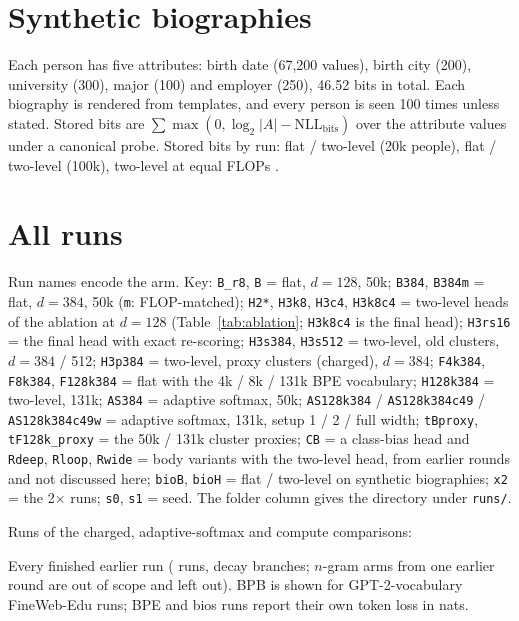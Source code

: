 \documentclass[11pt]{article}
\theoremstyle{remark}
\begin{document}
\section{Synthetic biographies}
Each person has five attributes: birth date (67,200 values), birth city (200), university (300), major (100) and employer (250),
46.52 bits in total. Each biography is rendered from templates, and every person is seen 100 times unless stated. Stored bits are
$\sum \max(0, \log_2|A| - \mathrm{NLL}_{\text{bits}})$ over the attribute values under a canonical probe. Stored bits by run:
flat \BitsBTwenty{} / two-level \BitsHTwenty{} (20k people), flat \BitsBHundred{} / two-level \BitsHHundred{} (100k), two-level at
equal FLOPs \BitsHEqF{}.

\section{All runs}\label{app:runs}
Run names encode the arm. Key: \texttt{B\_r8}, \texttt{B} = flat, $d=128$, 50k; \texttt{B384}, \texttt{B384m} = flat, $d=384$,
50k (\texttt{m}: FLOP-matched); \texttt{H2*}, \texttt{H3k8}, \texttt{H3c4}, \texttt{H3k8c4} = two-level heads of the ablation at
$d=128$ (Table~\ref{tab:ablation}; \texttt{H3k8c4} is the final head); \texttt{H3rs16} = the final head with exact re-scoring;
\texttt{H3s384}, \texttt{H3s512} = two-level, old clusters, $d=384$ / 512; \texttt{H3p384} = two-level, proxy clusters (charged),
$d=384$; \texttt{F4k384}, \texttt{F8k384}, \texttt{F128k384} = flat with the 4k / 8k / 131k BPE vocabulary; \texttt{H128k384} =
two-level, 131k; \texttt{AS384} = adaptive softmax, 50k; \texttt{AS128k384} / \texttt{AS128k384c49} / \texttt{AS128k384c49w} = adaptive
softmax, 131k, setup 1 / 2 / full width; \texttt{tBproxy}, \texttt{tF128k\_proxy} = the 50k / 131k cluster proxies; \texttt{CB} = a class-bias head and
\texttt{Rdeep}, \texttt{Rloop}, \texttt{Rwide} = body variants with the two-level head, from earlier rounds and not discussed
here; \texttt{bioB}, \texttt{bioH} = flat / two-level on synthetic biographies; \texttt{x2} = the 2$\times$ runs; \texttt{s0},
\texttt{s1} = seed. The folder column gives the directory under \texttt{runs/}.

Runs of the charged, adaptive-softmax and compute comparisons:
\begin{center}\scriptsize\setlength{\tabcolsep}{3pt}

\end{center}
Every finished earlier run (\RunCount{} runs, \BranchCount{} decay branches; $n$-gram arms from one earlier round are out of scope
and left out). BPB is shown for GPT-2-vocabulary FineWeb-Edu runs; BPE and bios runs report their own token loss in nats.
\begin{center}\scriptsize\setlength{\tabcolsep}{3pt}

\end{center}
\end{document}
